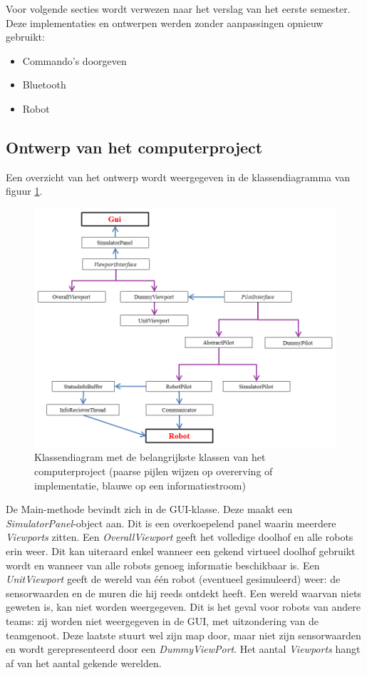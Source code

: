 \documentclass[tt2]{penoverslag}
\begin{document}
Voor volgende secties wordt verwezen naar het verslag van het eerste semester. Deze implementaties en ontwerpen werden zonder aanpassingen opnieuw gebruikt:

\begin{itemize}
\item Commando's doorgeven
\item Bluetooth
\item Robot
\end{itemize}

\subsection{Ontwerp van het computerproject}
\label{ssec:Sdesign}
Een overzicht van het ontwerp wordt weergegeven in de klassendiagramma van figuur \ref{fig:klasSoft}.\\

\begin{figure}
\centering
		\includegraphics[width=\textwidth]{KlasSoftware}
\caption[Klassendiagram computerproject]{Klassendiagram met de belangrijkste klassen van het computerproject (paarse pijlen wijzen op overerving of implementatie, blauwe op een informatiestroom)}
\label{fig:klasSoft}
\end{figure}

De Main-methode bevindt zich in de GUI-klasse. Deze maakt een \textit{SimulatorPanel}-object aan. Dit is een overkoepelend panel waarin meerdere \textit{Viewports} zitten. Een \textit{OverallViewport} geeft het volledige doolhof en alle robots erin weer. Dit kan uiteraard enkel wanneer een gekend virtueel doolhof gebruikt wordt en wanneer van alle robots genoeg informatie beschikbaar is. Een \textit{UnitViewport} geeft de wereld van \'e\'en robot (eventueel gesimuleerd) weer: de sensorwaarden en de muren die hij reeds ontdekt heeft. Een wereld waarvan niets geweten is, kan niet worden weergegeven. Dit is het geval voor robots van andere teams: zij worden niet weergegeven in de GUI, met uitzondering van de teamgenoot. Deze laatste stuurt wel zijn map door, maar niet zijn sensorwaarden en wordt gerepresenteerd door een \textit{DummyViewPort}. Het aantal \textit{Viewports} hangt af van het aantal gekende werelden.\\
\end{document}
